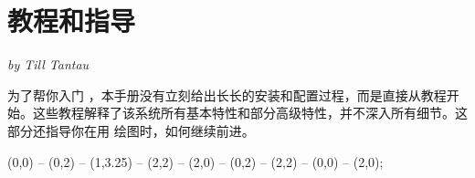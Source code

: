 \part{教程和指导}

{\Large \emph{by Till Tantau}}

\bigskip
\noindent
为了帮你入门 \tikzname，本手册没有立刻给出长长的安装和配置过程，而是直接从教程开始。这些教程解释了该系统所有基本特性和部分高级特性，并不深入所有细节。这部分还指导你在用 \tikzname 绘图时，如何继续前进。

\vskip3cm

\begin{codeexample}[graphic=white,width=0pt]
\tikz \draw[thick,rounded corners=8pt]
  (0,0) -- (0,2) -- (1,3.25) -- (2,2) -- (2,0) -- (0,2) -- (2,2) -- (0,0) -- (2,0);
\end{codeexample}

% 
% 
% 
% 
% 
% 
